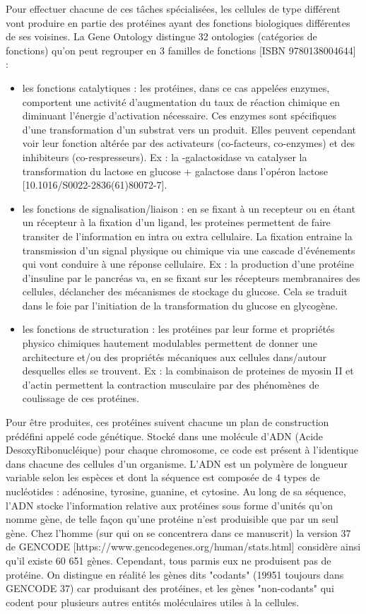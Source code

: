 Pour effectuer chacune de ces tâches spécialisées, les cellules de type différent vont produire en partie des protéines ayant des fonctions biologiques différentes de ses voisines. La Gene Ontology distingue 32 ontologies (catégories de fonctions) qu'on peut regrouper en 3 familles de fonctions [ISBN 9780138004644] : 
\begin{itemize}
    \item les fonctions catalytiques : les protéines, dans ce cas appelées enzymes, comportent une activité d'augmentation du taux de réaction chimique en diminuant l'énergie d'activation nécessaire. Ces enzymes sont spécifiques d'une transformation d'un substrat vers un produit. Elles peuvent cependant voir leur fonction altérée par des activateurs (co-facteurs, co-enzymes) et des inhibiteurs (co-respresseurs). Ex : la \textbeta-galactosidase va catalyser la transformation du lactose en glucose + galactose dans l'opéron lactose [10.1016/S0022-2836(61)80072-7].
    \item les fonctions de signalisation/liaison : en se fixant à un recepteur ou en étant un récepteur à la fixation d'un ligand, les proteines permettent de faire transiter de l'information en intra ou extra cellulaire. La fixation entraine la transmission d'un signal physique ou chimique via une cascade d'événements qui vont conduire à une réponse cellulaire. Ex : la production d'une protéine d'insuline par le pancréas va, en se fixant sur les récepteurs membranaires des cellules, déclancher des mécanismes de stockage du glucose. Cela se traduit dans le foie par l'initiation de la transformation du glucose en glycogène.
    \item les fonctions de structuration : les protéines par leur forme et propriétés physico chimiques hautement modulables permettent de donner une architecture et/ou des propriétés mécaniques aux cellules dans/autour desquelles elles se trouvent. Ex : la combinaison de proteines de myosin II et d'actin permettent la contraction musculaire par des phénomènes de coulissage de ces protéines.
\end{itemize}


Pour être produites, ces protéines suivent chacune un plan de construction prédéfini appelé code génétique. Stocké dans une molécule d'ADN (Acide DesoxyRibonucléique) pour chaque chromosome, ce code est présent à l'identique dans chacune des cellules d'un organisme. L'ADN est un polymère de longueur variable selon les espèces et dont la séquence est composée de 4 types de nucléotides : adénosine, tyrosine, guanine, et cytosine. Au long de sa séquence, l'ADN stocke l'information relative aux protéines sous forme d'unités qu'on nomme gène, de telle façon qu'une protéine n'est produisible que par un seul gène. Chez l'homme (sur qui on se concentrera dans ce manuscrit) la version 37 de GENCODE [https://www.gencodegenes.org/human/stats.html] considère ainsi qu'il existe 60 651 gènes. Cependant, tous parmis eux ne produisent pas de protéine. On distingue en réalité les gènes dits "codants" (19951 toujours dans GENCODE 37) car produisant des protéines, et les gènes "non-codants" qui codent pour plusieurs autres entités moléculaires utiles à la cellules.

